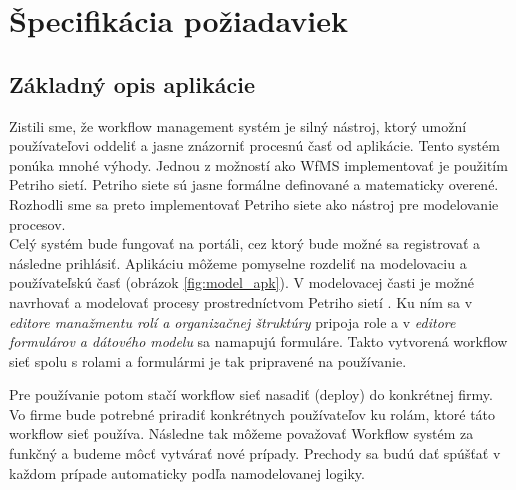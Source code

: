 


\section{Špecifikácia požiadaviek}

\subsection{Základný opis aplikácie}
Zistili sme, že workflow management systém je silný nástroj, ktorý umožní používateľovi oddeliť a jasne znázorniť procesnú časť od aplikácie. Tento systém ponúka mnohé výhody. Jednou z možností ako WfMS implementovať je použitím Petriho sietí. Petriho siete sú jasne formálne definované a matematicky overené.  Rozhodli sme sa preto implementovať Petriho siete ako nástroj pre modelovanie procesov.\\

Celý systém bude fungovať na portáli, cez ktorý bude možné sa registrovať a následne prihlásiť. Aplikáciu môžeme pomyselne rozdeliť na modelovaciu a používateľskú časť (obrázok \ref{fig:model_apk}). V modelovacej časti je možné navrhovať a modelovať procesy prostredníctvom Petriho sietí . Ku ním sa v \emph{editore manažmentu rolí a organizačnej štruktúry} pripoja role a v \emph{editore formulárov a dátového modelu} sa namapujú formuláre. Takto vytvorená workflow sieť spolu s rolami a formulármi je tak pripravené na používanie. 

Pre používanie potom stačí workflow sieť nasadiť (deploy) do konkrétnej firmy. Vo firme bude potrebné priradiť konkrétnych používateľov ku rolám, ktoré táto workflow sieť používa. Následne tak môžeme považovať Workflow systém za funkčný a budeme môcť vytvárať nové prípady. Prechody sa budú dať spúšťať v každom prípade  automaticky podľa namodelovanej logiky.


